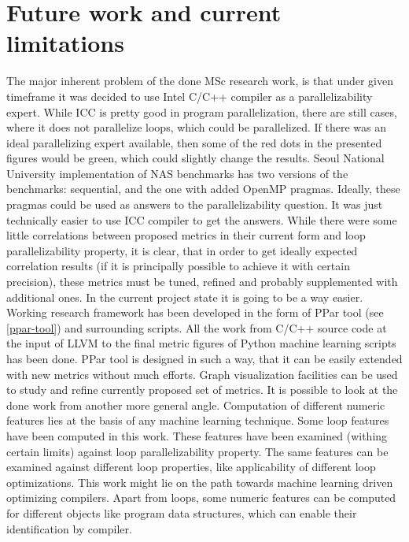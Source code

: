 \chapter{Future work and current limitations}
\label{future-work}
\qquad The major inherent problem of the done MSc research work, is that under given timeframe it was decided to use Intel C/C++ compiler as a parallelizability expert. While ICC is pretty good in program parallelization, there are still cases, where it does not parallelize loops, which could be parallelized. If there was an ideal parallelizing expert available, then some of the red dots in the presented figures would be green, which could slightly change the results. Seoul National University implementation of NAS benchmarks has two versions of the benchmarks: sequential, and the one with added OpenMP pragmas. Ideally, these pragmas could be used as answers to the parallelizability question. It was just technically easier to use ICC compiler to get the answers.\newline  
\null\qquad While there were some little correlations between proposed metrics in their current form and loop parallelizability property, it is clear, that in order to get ideally expected correlation results (if it is principally possible to achieve it with certain precision), these metrics must be tuned, refined and probably supplemented with additional ones. In the current project state it is going to be a way easier. Working research framework has been developed in the form of PPar tool (see \ref{ppar-tool}) and surrounding scripts. All the work from C/C++ source code at the input of LLVM to the final metric figures of Python machine learning scripts has been done. PPar tool is designed in such a way, that it can be easily extended with new metrics without much efforts. Graph visualization facilities can be used to study and refine currently proposed set of metrics.\newline
\null\qquad It is possible to look at the done work from another more general angle. Computation of different numeric features lies at the basis of any machine learning technique. Some loop features have been computed in this work. These features have been examined (withing certain limits) against loop parallelizability property. The same features can be examined against different loop properties, like applicability of different loop optimizations. This work might lie on the path towards machine learning driven optimizing compilers. Apart from loops, some numeric features can be computed for different objects like program data structures, which can enable their identification by compiler.